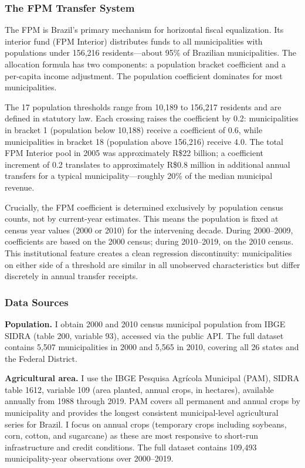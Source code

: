 \documentclass[12pt]{article}
\begin{document}
\subsubsection*{The FPM Transfer System}

The FPM is Brazil's primary mechanism for horizontal fiscal equalization. Its interior fund (FPM Interior) distributes funds to all municipalities with populations under 156,216 residents---about 95\% of Brazilian municipalities. The allocation formula has two components: a population bracket coefficient and a per-capita income adjustment. The population coefficient dominates for most municipalities.

The 17 population thresholds range from 10,189 to 156,217 residents and are defined in statutory law. Each crossing raises the coefficient by 0.2: municipalities in bracket 1 (population below 10,188) receive a coefficient of 0.6, while municipalities in bracket 18 (population above 156,216) receive 4.0. The total FPM Interior pool in 2005 was approximately R\$22 billion; a coefficient increment of 0.2 translates to approximately R\$0.8 million in additional annual transfers for a typical municipality---roughly 20\% of the median municipal revenue.

Crucially, the FPM coefficient is determined exclusively by population census counts, not by current-year estimates. This means the population is fixed at census year values (2000 or 2010) for the intervening decade. During 2000--2009, coefficients are based on the 2000 census; during 2010--2019, on the 2010 census. This institutional feature creates a clean regression discontinuity: municipalities on either side of a threshold are similar in all unobserved characteristics but differ discretely in annual transfer receipts.

\subsubsection*{Data Sources}

\textbf{Population.} I obtain 2000 and 2010 census municipal population from IBGE SIDRA (table 200, variable 93), accessed via the public API. The full dataset contains 5,507 municipalities in 2000 and 5,565 in 2010, covering all 26 states and the Federal District.

\textbf{Agricultural area.} I use the IBGE Pesquisa Agr\'{i}cola Municipal (PAM), SIDRA table 1612, variable 109 (area planted, annual crops, in hectares), available annually from 1988 through 2019. PAM covers all permanent and annual crops by municipality and provides the longest consistent municipal-level agricultural series for Brazil. I focus on annual crops (temporary crops including soybeans, corn, cotton, and sugarcane) as these are most responsive to short-run infrastructure and credit conditions. The full dataset contains 109,493 municipality-year observations over 2000--2019.
\end{document}

